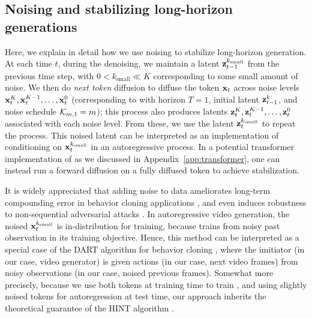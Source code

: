 \subsection{Noising and stabilizing long-horizon generations}\label{app:noising_long_horizons}
\newcommand{\ksmall}{k_{\mathrm{small}}}
Here, we explain in detail how we use noising to stabilize long-horizon generation. At each time $t$, during the denoising, we maintain a latent $\bz_{t-1}^{\ksmall}$ from the previous time step, with $0 < \ksmall \ll K$ corresponding to some small amount of noise. We then do \emph{next token} diffusion to diffuse the token $\mathbf{x}_t$ across noise levels $\mathbf{x}_t^{K},\mathbf{x}_{t}^{K-1},\dots,\mathbf{x}_t^0$ (corresponding to  with horizon $T = 1$, initial latent $\mathbf{z}_{t-1}^k$, and noise schedule $\mathcal{K}_{m,1} = m$); this process also produces latents $\mathbf{z}_t^K,\mathbf{z}_t^{K-1},\dots,\mathbf{z}_t^0$ associated with each noise level. From these, we use the latent $\bz_t^{\ksmall}$ to repeat the process. This noised latent can be interpreted as an implementation of conditioning on $\bx_t^{\ksmall}$ in an autoregressive process. In a potential transformer implementation of \algo{} as we discussed in Appendix~\ref{app:transformer}, one can instead run a forward diffusion on a fully diffused token to achieve stabilization. 

It is widely appreciated that adding noise to data ameliorates long-term compounding error in behavior cloning applications \cite{ke2021grasping,laskey2017dart}, and even induces robustness to non-sequential adversarial attacks \cite{cohen2019certified}. In autoregressive video generation, the noised  $\bx_t^{\ksmall}$ is in-distribution for training, because \algo{} trains from noisy past observation in its training objective.
Hence, this method can be interpreted as a special case of the DART algorithm for behavior cloning \cite{laskey2017dart}, where the imitiator (in our case, video generator) is given actions (in our case, next video frames) from noisy observations (in our case, noised previous frames). Somewhat more precisely, because we use both tokens at training time to train \algo, and using slightly noised tokens for autoregression at test time, our approach inherits the theoretical guarantee of the HINT algorithm \cite{block2023provable}.



